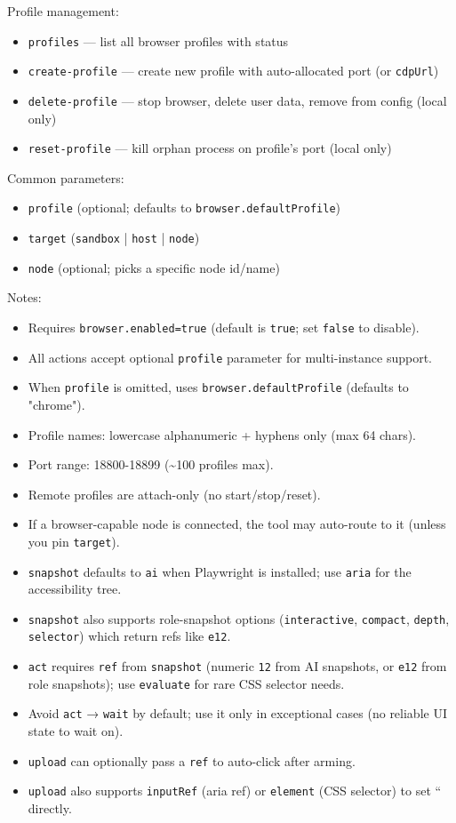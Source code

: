 Profile management:

\begin{itemize}
  \item \texttt{profiles} — list all browser profiles with status
  \item \texttt{create-profile} — create new profile with auto-allocated port (or \texttt{cdpUrl})
  \item \texttt{delete-profile} — stop browser, delete user data, remove from config (local only)
  \item \texttt{reset-profile} — kill orphan process on profile's port (local only)
\end{itemize}


Common parameters:

\begin{itemize}
  \item \texttt{profile} (optional; defaults to \texttt{browser.defaultProfile})
  \item \texttt{target} (\texttt{sandbox} | \texttt{host} | \texttt{node})
  \item \texttt{node} (optional; picks a specific node id/name)
\end{itemize}

Notes:
\begin{itemize}
  \item Requires \texttt{browser.enabled=true} (default is \texttt{true}; set \texttt{false} to disable).
  \item All actions accept optional \texttt{profile} parameter for multi-instance support.
  \item When \texttt{profile} is omitted, uses \texttt{browser.defaultProfile} (defaults to "chrome").
  \item Profile names: lowercase alphanumeric + hyphens only (max 64 chars).
  \item Port range: 18800-18899 (\textasciitilde{}100 profiles max).
  \item Remote profiles are attach-only (no start/stop/reset).
  \item If a browser-capable node is connected, the tool may auto-route to it (unless you pin \texttt{target}).
  \item \texttt{snapshot} defaults to \texttt{ai} when Playwright is installed; use \texttt{aria} for the accessibility tree.
  \item \texttt{snapshot} also supports role-snapshot options (\texttt{interactive}, \texttt{compact}, \texttt{depth}, \texttt{selector}) which return refs like \texttt{e12}.
  \item \texttt{act} requires \texttt{ref} from \texttt{snapshot} (numeric \texttt{12} from AI snapshots, or \texttt{e12} from role snapshots); use \texttt{evaluate} for rare CSS selector needs.
  \item Avoid \texttt{act} → \texttt{wait} by default; use it only in exceptional cases (no reliable UI state to wait on).
  \item \texttt{upload} can optionally pass a \texttt{ref} to auto-click after arming.
  \item \texttt{upload} also supports \texttt{inputRef} (aria ref) or \texttt{element} (CSS selector) to set `` directly.
\end{itemize}


